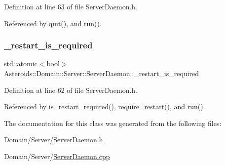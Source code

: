 Definition at line 63 of file Server\+Daemon.\+h.



Referenced by quit(), and run().

\mbox{\label{classAsteroids_1_1Domain_1_1Server_1_1ServerDaemon_a841bf5530b6ae5d6cbc89d50a4280f0c}} 
\subsubsection{\texorpdfstring{\+\_\+restart\+\_\+is\+\_\+required}{\_restart\_is\_required}}
{\footnotesize\ttfamily std\+::atomic$<$bool$>$ Asteroids\+::\+Domain\+::\+Server\+::\+Server\+Daemon\+::\+\_\+restart\+\_\+is\+\_\+required\hspace{0.3cm}{\ttfamily [private]}}



Definition at line 62 of file Server\+Daemon.\+h.



Referenced by is\+\_\+restart\+\_\+required(), require\+\_\+restart(), and run().



The documentation for this class was generated from the following files\+:\begin{DoxyCompactItemize}
\item 
Domain/\+Server/\hyperlink{ServerDaemon_8h}{Server\+Daemon.\+h}\item 
Domain/\+Server/\hyperlink{ServerDaemon_8cpp}{Server\+Daemon.\+cpp}\end{DoxyCompactItemize}
